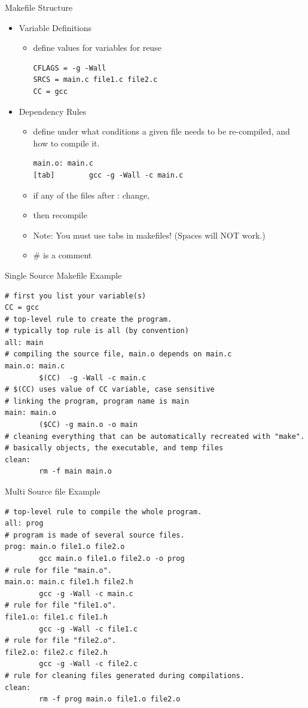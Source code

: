 \documentclass{beamer}
\begin{document}
\begin{frame}[fragile]{Makefile Structure}
\begin{itemize}
\item Variable Definitions 
\begin{itemize}
\item define values for variables for reuse\\
\begin{lstlisting}
CFLAGS = -g -Wall 
SRCS = main.c file1.c file2.c 
CC = gcc 
\end{lstlisting}
\end{itemize}
\item Dependency Rules 
\begin{itemize}
\item define under what conditions a given file needs to be re-compiled, and how to compile it. \\
\begin{lstlisting}
main.o: main.c
[tab]        gcc -g -Wall -c main.c 
\end{lstlisting}
\item if any of the files after : change, 
\item then recompile
\item Note: You must use tabs in makefiles! (Spaces will NOT work.)
\item \# is a comment
\end{itemize}
\end{itemize}
\end{frame}

\lstset{language=make}

\begin{frame}[fragile]{Single Source Makefile Example}
\begin{lstlisting}
# first you list your variable(s)
CC = gcc
# top-level rule to create the program. 
# typically top rule is all (by convention)
all: main 
# compiling the source file, main.o depends on main.c
main.o: main.c 
        $(CC)  -g -Wall -c main.c 
# $(CC) uses value of CC variable, case sensitive
# linking the program, program name is main
main: main.o 
        ($CC) -g main.o -o main 
# cleaning everything that can be automatically recreated with "make". 
# basically objects, the executable, and temp files
clean: 
        rm -f main main.o
\end{lstlisting}
\end{frame}

\begin{frame}[fragile]{Multi Source file Example}
\begin{lstlisting}
# top-level rule to compile the whole program. 
all: prog 
# program is made of several source files. 
prog: main.o file1.o file2.o 
        gcc main.o file1.o file2.o -o prog 
# rule for file "main.o". 
main.o: main.c file1.h file2.h 
        gcc -g -Wall -c main.c 
# rule for file "file1.o". 
file1.o: file1.c file1.h 
        gcc -g -Wall -c file1.c 
# rule for file "file2.o". 
file2.o: file2.c file2.h 
        gcc -g -Wall -c file2.c 
# rule for cleaning files generated during compilations. 
clean: 
        rm -f prog main.o file1.o file2.o
\end{lstlisting}
\end{frame}
\end{document}
